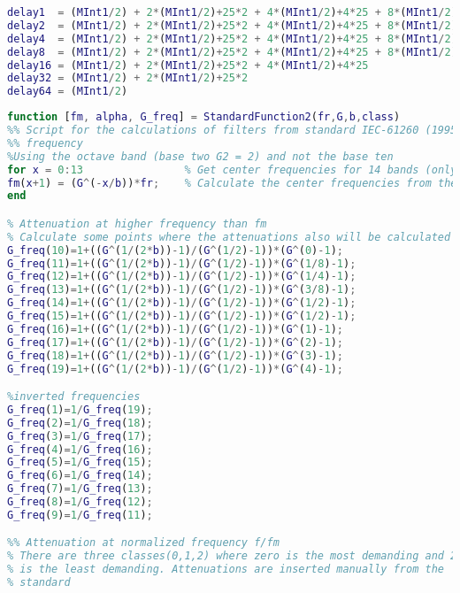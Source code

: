 \begin{lstlisting}[language=Matlab, caption = {Matlab script for designing FIR filters},label={ls:FIRMatlabScript}]
%% Delays2
delay1  = (MInt1/2) + 2*(MInt1/2)+25*2 + 4*(MInt1/2)+4*25 + 8*(MInt1/2)+25*8 + 16*(MInt1/2)+25*16 + 32*(MInt1/2)+25*32 + 64*(MInt1/2)+25*64
delay2  = (MInt1/2) + 2*(MInt1/2)+25*2 + 4*(MInt1/2)+4*25 + 8*(MInt1/2)+25*8 + 16*(MInt1/2)+25*16 + 32*(MInt1/2)+25*32
delay4  = (MInt1/2) + 2*(MInt1/2)+25*2 + 4*(MInt1/2)+4*25 + 8*(MInt1/2)+25*8 + 16*(MInt1/2)+25*16
delay8  = (MInt1/2) + 2*(MInt1/2)+25*2 + 4*(MInt1/2)+4*25 + 8*(MInt1/2)+25*8
delay16 = (MInt1/2) + 2*(MInt1/2)+25*2 + 4*(MInt1/2)+4*25
delay32 = (MInt1/2) + 2*(MInt1/2)+25*2
delay64 = (MInt1/2)

\end{lstlisting}

\begin{lstlisting}[language=Matlab, caption = {Matlab script for standard functions},label={ls:StandardFunctions}]
function [fm, alpha, G_freq] = StandardFunction2(fr,G,b,class)
%% Script for the calculations of filters from standard IEC-61260 (1995)
%% frequency 
%Using the octave band (base two G2 = 2) and not the base ten 
for x = 0:13                % Get center frequencies for 14 bands (only need 8)
fm(x+1) = (G^(-x/b))*fr;    % Calculate the center frequencies from the input 
end

% Attenuation at higher frequency than fm
% Calculate some points where the attenuations also will be calculated
G_freq(10)=1+((G^(1/(2*b))-1)/(G^(1/2)-1))*(G^(0)-1);
G_freq(11)=1+((G^(1/(2*b))-1)/(G^(1/2)-1))*(G^(1/8)-1);
G_freq(12)=1+((G^(1/(2*b))-1)/(G^(1/2)-1))*(G^(1/4)-1); 
G_freq(13)=1+((G^(1/(2*b))-1)/(G^(1/2)-1))*(G^(3/8)-1); 
G_freq(14)=1+((G^(1/(2*b))-1)/(G^(1/2)-1))*(G^(1/2)-1); 
G_freq(15)=1+((G^(1/(2*b))-1)/(G^(1/2)-1))*(G^(1/2)-1); 
G_freq(16)=1+((G^(1/(2*b))-1)/(G^(1/2)-1))*(G^(1)-1); 
G_freq(17)=1+((G^(1/(2*b))-1)/(G^(1/2)-1))*(G^(2)-1); 
G_freq(18)=1+((G^(1/(2*b))-1)/(G^(1/2)-1))*(G^(3)-1); 
G_freq(19)=1+((G^(1/(2*b))-1)/(G^(1/2)-1))*(G^(4)-1); 

%inverted frequencies
G_freq(1)=1/G_freq(19);
G_freq(2)=1/G_freq(18);
G_freq(3)=1/G_freq(17);
G_freq(4)=1/G_freq(16);
G_freq(5)=1/G_freq(15);
G_freq(6)=1/G_freq(14);
G_freq(7)=1/G_freq(13);
G_freq(8)=1/G_freq(12);
G_freq(9)=1/G_freq(11);

%% Attenuation at normalized frequency f/fm
% There are three classes(0,1,2) where zero is the most demanding and 2 
% is the least demanding. Attenuations are inserted manually from the
% standard


\end{lstlisting}
